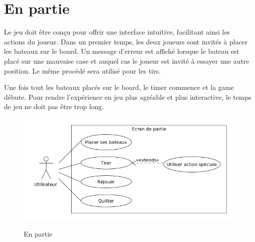 \documentclass[../besoin_user.tex]{subfiles}
\begin{document}
\section{En partie}

Le jeu doit être conçu pour offrir une interface intuitive, facilitant ainsi les actions du joueur.
Dans un premier temps, les deux joueurs sont invités à placer les bateaux sur le board.
Un message d'erreur est affiché lorsque le bateau est placé sur une mauvaise case et auquel cas le joueur est invité à 
essayer une autre position. Le même procédé sera utilisé pour les tirs.

Une fois tout les bateaux placés sur le board, le timer commence et la game débute.
Pour rendre l'expérience en jeu plus agréable et plus interactive, le temps de jeu ne doit pas être trop long.

\begin{figure}[h]
    \centering
    \includegraphics[scale=0.6]{img_fonctionnel/use_case_user_ecran_partie.png}
    \label{fig:user_partie}
    \caption{En partie}
\end{figure}
\end{document}

